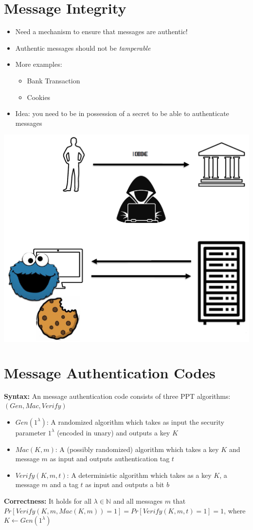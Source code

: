 \section{Message Integrity}
	\begin{itemize}
		\item Need a mechanism to ensure that messages are authentic!
		\item Authentic messages should not be \textit{tamperable}
		\item More examples:
		\begin{itemize}
			\item Bank Transaction
			\item Cookies
		\end{itemize}
		\item Idea: you need to be in possession of a secret to be able to authenticate messages
	\end{itemize}
	\begin{center}
		\includegraphics[width=140mm]{Graphics/Authentication/a2.png}
	\end{center}

\section{Message Authentication Codes}
	\textbf{Syntax:} An message authentication code consists of three PPT algorithms: $(Gen,Mac,Verify)$
	\begin{itemize}
		\item $Gen(1^{\lambda})$: A randomized algorithm which takes as input the security parameter $1^{\lambda}$ (encoded in unary) and outputs a key $K$
		\item $Mac(K,m)$: A (possibly randomized) algorithm which takes a key $K$ and message $m$ as input and outputs authentication tag $t$
		\item $Verify(K,m,t)$: A deterministic algorithm which takes as a key $K$, a message $m$ and a tag $t$ as input and outputs a bit $b$
	\end{itemize}
	\textbf{Correctness:} It holds for all $\lambda \in \mathbb{N}$ and all messages $m$ that $Pr[Verify(K,m,Mac(K,m)) = 1] = Pr[Verify(K,m,t) = 1] = 1$, where $K \leftarrow Gen(1^{\lambda})$


